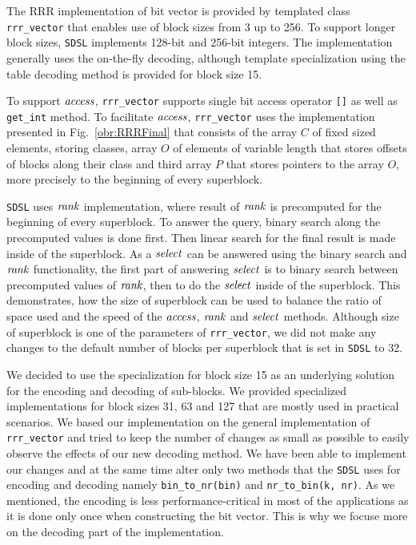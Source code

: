 The RRR implementation of bit vector is provided by templated class \texttt{rrr\_vector}
that enables use of block sizes from 3 up to 256. To support longer block sizes,
\texttt{SDSL} implements 128-bit and 256-bit integers. The implementation generally uses the
on-the-fly decoding, although template specialization using the table decoding method is provided
for block size 15.

To support $\mathit{access}$, \texttt{rrr\_vector} supports single bit access operator \texttt{[]} as well
as \texttt{get\_int} method. To facilitate $\mathit{access}$, \texttt{rrr\_vector} uses the implementation
presented in Fig.~\ref{obr:RRRFinal} that consists of the array $C$ of fixed sized elements, storing
classes, array $O$ of elements of variable length that stores offsets of blocks along their class and
third array $P$ that stores pointers to the array $O$, more precisely to the beginning of every superblock.

\texttt{SDSL} uses $\mathit{rank}$ implementation, where result of $\mathit{rank}$ is precomputed for the beginning
of every superblock. To answer the query, binary search along the precomputed values is done first.
Then linear search for the final result is made inside of the superblock. As a $\mathit{select}$ can be answered
using the binary search and $\mathit{rank}$ functionality, the first part of answering $\mathit{select}$ is to binary
search between precomputed values of $\mathit{rank}$, then to do the $\mathit{select}$ inside of the superblock. This
demonstrates, how the size of superblock can be used to balance the ratio of space used and the speed
of the $\mathit{access}$, $\mathit{rank}$ and $\mathit{select}$ methods. Although size of superblock is one of the parameters
of \texttt{rrr\_vector}, we did not make any changes to the default number of blocks per superblock that
is set in \texttt{SDSL} to 32.

We decided to use the specialization for block size 15 as an underlying solution for the encoding and
decoding of sub-blocks. We provided specialized implementations for block sizes 31, 63 and 127 that
are mostly used in practical scenarios. We based our implementation on the general implementation of
\texttt{rrr\_vector} and tried to keep the number of changes as small as possible to easily observe the
effects of our new decoding method. We have been able to implement our changes and at the same time alter
only two methods that the \texttt{SDSL} uses for encoding and decoding namely \texttt{bin\_to\_nr(bin)} and
\texttt{nr\_to\_bin(k, nr)}. As we mentioned, the encoding is less performance-critical in most of the
applications as it is done only once when constructing the bit vector. This is why we focuse more on the
decoding part of the implementation.

